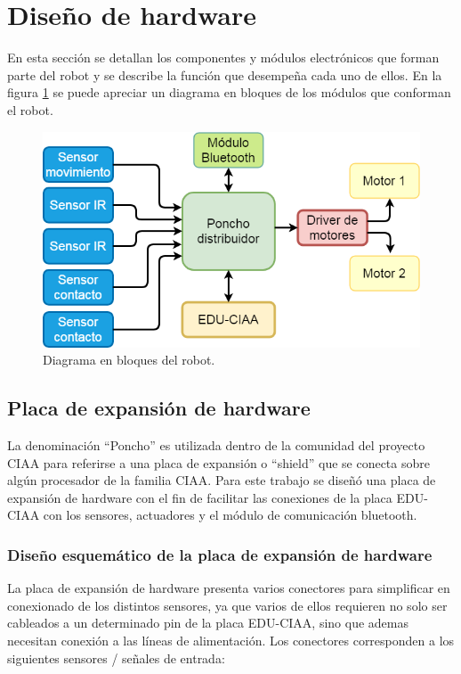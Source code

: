 \section{Diseño de hardware}

En esta sección se detallan los componentes y módulos electrónicos que forman parte del robot y se describe la función que desempeña cada uno de ellos. En la figura \ref{fig:diagramaini} se puede apreciar un diagrama en bloques de los módulos que conforman el robot.


\begin{figure}[h]
	\centering
	\includegraphics[width=12cm]{./Figures/diagini.PNG}
	\caption{Diagrama en bloques del robot.}
	\label{fig:diagramaini}
\end{figure}



	\subsection{Placa de expansión de hardware}
La denominación  “Poncho”  es utilizada dentro de la comunidad del proyecto CIAA para referirse a una placa de expansión o “shield” que se conecta sobre algún procesador de la familia CIAA.  
Para este trabajo se diseñó una placa de expansión de hardware con el fin de facilitar las conexiones de la placa EDU-CIAA con los sensores, actuadores y el módulo de comunicación bluetooth.

	\subsubsection{Diseño esquemático de la placa de expansión de hardware}

La placa de expansión de hardware presenta varios conectores para simplificar en conexionado de los distintos sensores, ya que varios de ellos requieren no solo ser cableados a un determinado pin de la placa EDU-CIAA, sino que ademas necesitan conexión a las líneas de alimentación. Los conectores corresponden a los siguientes sensores / señales de entrada:

